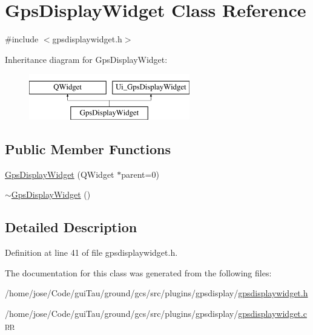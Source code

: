 \hypertarget{class_gps_display_widget}{\section{Gps\-Display\-Widget Class Reference}
\label{class_gps_display_widget}
}


{\ttfamily \#include $<$gpsdisplaywidget.\-h$>$}

Inheritance diagram for Gps\-Display\-Widget\-:\begin{figure}[H]
\begin{center}
\leavevmode
\includegraphics[height=2.000000cm]{class_gps_display_widget}
\end{center}
\end{figure}
\subsection*{Public Member Functions}
\begin{DoxyCompactItemize}
\item 
\hyperlink{group___g_p_s_gadget_plugin_gab1f79fecf5da3b9fde3b8c100406dfd8}{Gps\-Display\-Widget} (Q\-Widget $\ast$parent=0)
\item 
\hyperlink{group___g_p_s_gadget_plugin_gaf71af26494c1e959b1b6b3eabd861e53}{$\sim$\-Gps\-Display\-Widget} ()
\end{DoxyCompactItemize}


\subsection{Detailed Description}


Definition at line 41 of file gpsdisplaywidget.\-h.



The documentation for this class was generated from the following files\-:\begin{DoxyCompactItemize}
\item 
/home/jose/\-Code/gui\-Tau/ground/gcs/src/plugins/gpsdisplay/\hyperlink{gpsdisplaywidget_8h}{gpsdisplaywidget.\-h}\item 
/home/jose/\-Code/gui\-Tau/ground/gcs/src/plugins/gpsdisplay/\hyperlink{gpsdisplaywidget_8cpp}{gpsdisplaywidget.\-cpp}\end{DoxyCompactItemize}
